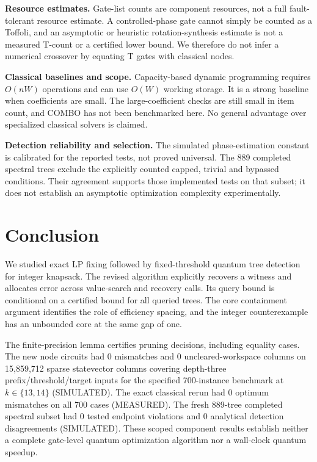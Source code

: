 \documentclass[pdflatex,sn-mathphys-num]{sn-jnl}
\begin{document}
\textbf{Resource estimates.} Gate-list counts are component resources, not a full fault-tolerant resource estimate. A controlled-phase gate cannot simply be counted as a Toffoli, and an asymptotic or heuristic rotation-synthesis estimate is not a measured T-count or a certified lower bound. We therefore do not infer a numerical crossover by equating T gates with classical nodes.

\textbf{Classical baselines and scope.} Capacity-based dynamic programming requires $O(nW)$ operations and can use $O(W)$ working storage. It is a strong baseline when coefficients are small. The large-coefficient checks are still small in item count, and COMBO has not been benchmarked here. No general advantage over specialized classical solvers is claimed.

\textbf{Detection reliability and selection.} The simulated phase-estimation constant is calibrated for the reported tests, not proved universal. The 889 completed spectral trees exclude the explicitly counted capped, trivial and bypassed conditions. Their agreement supports those implemented tests on that subset; it does not establish an asymptotic optimization complexity experimentally.


\section{Conclusion}
We studied exact LP fixing followed by fixed-threshold quantum tree detection for integer knapsack. The revised algorithm explicitly recovers a witness and allocates error across value-search and recovery calls. Its query bound is conditional on a certified bound for all queried trees. The core containment argument identifies the role of efficiency spacing, and the integer counterexample has an unbounded core at the same gap of one.

The finite-precision lemma certifies pruning decisions, including equality cases. The new node circuits had 0 mismatches and 0 uncleared-workspace columns on 15,859,712 sparse statevector columns covering depth-three prefix/threshold/target inputs for the specified 700-instance benchmark at $k\in\{13,14\}$ (SIMULATED). The exact classical rerun had 0 optimum mismatches on all 700 cases (MEASURED). The fresh 889-tree completed spectral subset had 0 tested endpoint violations and 0 analytical detection disagreements (SIMULATED). These scoped component results establish neither a complete gate-level quantum optimization algorithm nor a wall-clock quantum speedup.
\end{document}
